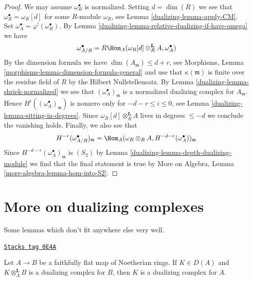 \begin{proof}
\medskip\noindent
We may assume $\omega_R^\bullet$ is normalized.
Setting $d = \dim(R)$ we see that $\omega_R^\bullet = \omega_R[d]$
for some $R$-module $\omega_R$, see
Lemma \ref{dualizing-lemma-apply-CM}. Set
$\omega_A^\bullet = \varphi^!(\omega_R^\bullet)$.
By Lemma \ref{dualizing-lemma-relative-dualizing-if-have-omega} we have
$$
\omega_{A/R}^\bullet =
R\Hom_A(\omega_R[d] \otimes_R^\mathbf{L} A, \omega_A^\bullet)
$$
By the dimension formula we have $\dim(A_\mathfrak m) \leq d + r$, see
Morphisms, Lemma \ref{morphisms-lemma-dimension-formula-general}
and use that $\kappa(\mathfrak m)$ is finite over the residue field of $R$
by the Hilbert Nullstellensatz.
By Lemma \ref{dualizing-lemma-shriek-normalized}
we see that $(\omega_A^\bullet)_\mathfrak m$
is a normalized dualizing complex for $A_\mathfrak m$.
Hence $H^i((\omega_A^\bullet)_\mathfrak m)$ is nonzero
only for $-d - r \leq i \leq 0$, see
Lemma \ref{dualizing-lemma-sitting-in-degrees}.
Since $\omega_R[d] \otimes_R^\mathbf{L} A$ lives in
degrees $\leq -d$ we conclude the vanishing holds.
Finally, we also see that
$$
H^{-r}(\omega_{A/R}^\bullet)_\mathfrak m =
\Hom_A(\omega_R \otimes_R A, H^{-d - r}(\omega_A^\bullet))_\mathfrak m
$$
Since $H^{-d - r}(\omega_A^\bullet)_\mathfrak m$ is $(S_2)$ by
Lemma \ref{dualizing-lemma-depth-dualizing-module}
we find that the final statement is true by
More on Algebra, Lemma \ref{more-algebra-lemma-hom-into-S2}.
\end{proof}

\section{More on dualizing complexes}
\label{dualizing-section-more-dualizing}
Some lemmas which don't fit anywhere else very well.

\begin{lemma}[Descent]
\label{dualizing-lemma-descent}
\href{https://stacks.math.columbia.edu/tag/0E4A}{\texttt{Stacks tag 0E4A}}

Let $A \to B$ be a faithfully flat map of Noetherian rings.
If $K \in D(A)$ and $K \otimes_A^\mathbf{L} B$
is a dualizing complex for $B$, then $K$ is a dualizing complex
for $A$.
\end{lemma}


